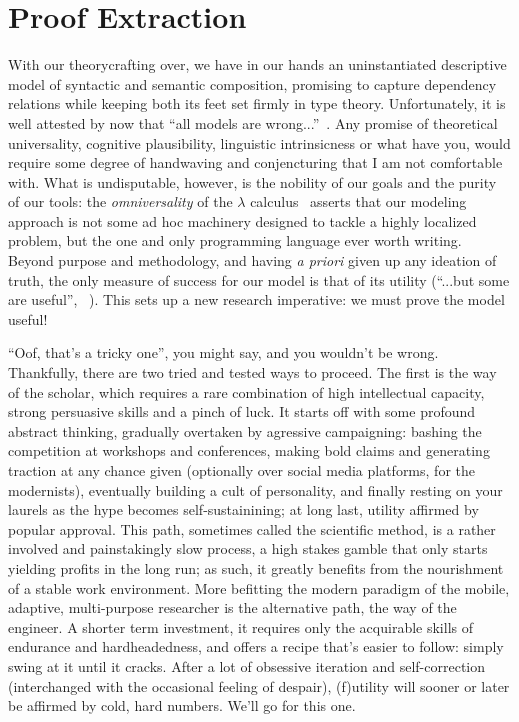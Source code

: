 \chapter{Proof Extraction}
\label{chapter:chapter_3}


With our theorycrafting over, we have in our hands an uninstantiated descriptive model of syntactic and semantic composition, promising to capture dependency relations while keeping both its feet set firmly in type theory.
Unfortunately, it is well attested by now that ``all models are wrong...''~\cite{doi:10.1080/01621459.1976.10480949}.
Any promise of theoretical universality, cognitive plausibility, linguistic intrinsicness or what have you, would require some degree of handwaving and conjencturing that I am not comfortable with.
What is undisputable, however, is the nobility of our goals and the purity of our tools: the \textit{omniversality} of the $\lambda$ calculus~\cite{wadler2015propositions} asserts that our modeling approach is not some ad hoc machinery designed to tackle a highly localized problem, but the one and only programming language ever worth writing. 
Beyond purpose and methodology, and having \textit{a priori} given up any ideation of truth, the only measure of success for our model is that of its utility (``...but some are useful'', ~\cite{doi:10.1080/01621459.1976.10480949}).
This sets up a new research imperative: we must prove the model useful!

``Oof, that's a tricky one'', you might say, and you wouldn't be wrong.
Thankfully, there are two tried and tested ways to proceed.
The first is the way of the scholar, which requires a rare combination of high intellectual capacity, strong persuasive skills and a pinch of luck.
It starts off with some profound abstract thinking, gradually overtaken by agressive campaigning: bashing the competition at workshops and conferences, making bold claims and generating traction at any chance given (optionally over social media platforms, for the modernists), eventually building a cult of personality, and finally resting on your laurels as the hype becomes self-sustainining; at long last, utility affirmed by popular approval.
This path, sometimes called the scientific method, is a rather involved and painstakingly slow process, a high stakes gamble that only starts yielding profits in the long run; as such, it greatly benefits from the nourishment of a stable work environment.
More befitting the modern paradigm of the mobile, adaptive, multi-purpose researcher is the alternative path, the way of the engineer.
A shorter term investment, it requires only the acquirable skills of endurance and hardheadedness, and offers a recipe that's easier to follow: simply swing at it until it cracks.
After a lot of obsessive iteration and self-correction (interchanged with the occasional feeling of despair), (f)utility will sooner or later be affirmed by cold, hard numbers.
We'll go for this one.

